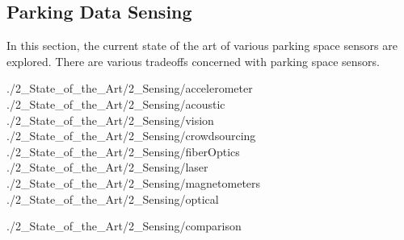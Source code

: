 \subsection{Parking Data Sensing}
In this section, the current state of the art of various parking space sensors are explored. There are various tradeoffs concerned with parking space sensors.

{./2_State_of_the_Art/2_Sensing/accelerometer}
{./2_State_of_the_Art/2_Sensing/acoustic}
{./2_State_of_the_Art/2_Sensing/vision}
{./2_State_of_the_Art/2_Sensing/crowdsourcing}
{./2_State_of_the_Art/2_Sensing/fiberOptics}
{./2_State_of_the_Art/2_Sensing/laser}
{./2_State_of_the_Art/2_Sensing/magnetometers}
{./2_State_of_the_Art/2_Sensing/optical}

{./2_State_of_the_Art/2_Sensing/comparison}
